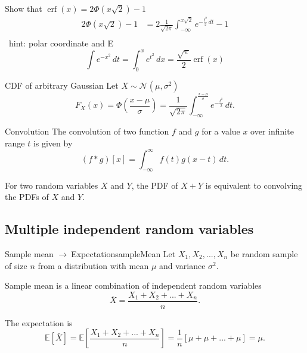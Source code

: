 \documentclass[11pt,a4paper,fleqn]{article}
\numberwithin{equation}{section}
\newcommand{\g}{$\rightarrow\ $}
\DeclareMathOperator\Erf{\ensuremath{\text{erf}}}
\newcommand{\mean}[1]{\bar{#1}}
\newcommand{\TODO}{\textcolor{ErrorRed}{\fbox{TODO}}\ }
\begin{document}
\begin{exec}
    Show that $\Erf(x)=2\Phi(x\sqrt{2})-1$
    \tcblower
    \TODO
    \begin{align*}
        2\Phi(x\sqrt{2})-1
        &= 2\frac{1}{\sqrt{2\pi}}\int_{-\infty}^{x\sqrt{2}}e^{-\frac{t^2}{2}\,dt}-1\\
    \end{align*}
    \TODO hint: polar coordinate and E
    \begin{equation*}
        \int e^{-x^2}\,dt = \int_{0}^{x} e^{t^2}\,dx = \frac{\sqrt{\pi}}{2}\Erf(x)
    \end{equation*}
\end{exec}

\begin{fact}{CDF of arbitrary Gaussian}{}
    Let $X\sim \mathcal{N}(\mu, \sigma^2)$
    \begin{equation*}
        F_X(x)=\Phi(\frac{x-\mu}{\sigma}) = \frac{1}{\sqrt{2\pi}}\int_{-\infty}^{\frac{x-\mu}{\sigma}} e^{-\frac{t^2}{2}}\,dt.
    \end{equation*}
\end{fact}

\begin{fact}{Convolution}{}
    The convolution of two function $f$ and $g$ for a value $x$ over infinite range $t$ is given by
    \begin{equation*}
        (f*g)[x] = \int_{-\infty}^{\infty}f(t)g(x-t)\,dt.
    \end{equation*}
\end{fact}

For two random variables $X$ and $Y$, the PDF of $X+Y$ is equivalent to convolving the PDFs of $X$ and $Y$.

\subsection{Multiple independent random variables}

\begin{fact}{Sample mean \g  Expectation}{sampleMean}
    Let $X_1,X_2,...,X_n$ be random sample of size $n$ from a distribution with mean $\mu$ and variance $\sigma^2$.
    
    Sample mean is a linear combination of independent random variables
    \begin{equation*}
        \mean{X}=\frac{X_1+X_2+...+X_n}{n}.
    \end{equation*}
    
    The expectation is
    \begin{equation*}
        \mathbb{E}[\mean{X}]=\mathbb{E}[\frac{X_1+X_2+...+X_n}{n}]=\frac{1}{n}[\mu+\mu+...+\mu]=\mu.
    \end{equation*}
\end{fact}
\end{document}
